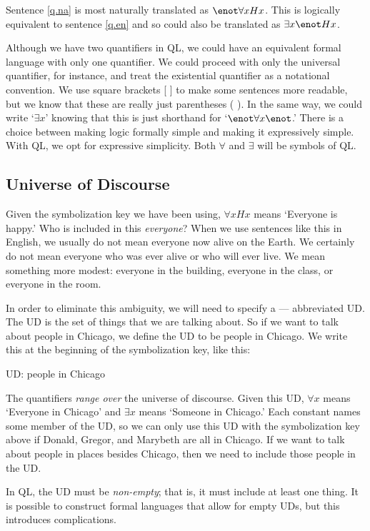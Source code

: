 Sentence \ref{q.na} is most naturally translated as $\enot\forall xHx$. This is logically equivalent to sentence \ref{q.en} and so could also be translated as $\exists x \enot Hx$.

Although we have two quantifiers in QL, we could have an equivalent formal language with only one quantifier. We could proceed with only the universal quantifier, for instance, and treat the existential quantifier as a notational convention. We use square brackets [ ] to make some sentences more readable, but we know that these are really just parentheses ( ). In the same way, we could write `$\exists x$' knowing that this is just shorthand for `$\enot \forall x \enot$.' There is a choice between making logic formally simple and making it expressively simple. With QL, we opt for expressive simplicity. Both $\forall$ and $\exists$ will be symbols of QL.


\subsection{Universe of Discourse}
Given the symbolization key we have been using, $\forall xHx$ means `Everyone is happy.' Who is included in this \emph{everyone}? When we use sentences like this in English, we usually do not mean everyone now alive on the Earth. We certainly do not mean everyone who was ever alive or who will ever live. We mean something more modest: everyone in the building, everyone in the class, or everyone in the room.

In order to eliminate this ambiguity, we will need to specify a --- abbreviated UD. The UD is the set of things that we are talking about. So if we want to talk about people in Chicago, we define the UD to be people in Chicago. We write this at the beginning of the symbolization key, like this:
\begin{ekey}
\item[UD:] people in Chicago
\end{ekey}
The quantifiers \emph{range over} the universe of discourse. Given this UD, $\forall x$ means `Everyone in Chicago' and $\exists x$ means `Someone in Chicago.' Each constant names some member of the UD, so we can only use this UD with the symbolization key above if Donald, Gregor, and Marybeth are all in Chicago. If we want to talk about people in places besides Chicago, then we need to include those people in the UD.

In QL, the UD must be \emph{non-empty}; that is, it must include at least one thing. It is possible to construct formal languages that allow for empty UDs, but this introduces complications.

